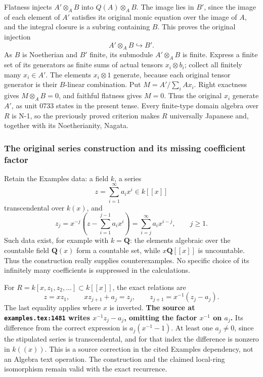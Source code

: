 Flatness injects \(A'\otimes_AB\) into \(Q(A)\otimes_AB\). The image lies in \(B'\), since the image of each element of \(A'\) satisfies its original monic equation over the image of \(A\), and the integral closure is a subring containing \(B\). This proves the original injection \[
 A'\otimes_AB\hookrightarrow B'.
\] As \(B\) is Noetherian and \(B'\) finite, its submodule \(A'\otimes_AB\) is finite. Express a finite set of its generators as finite sums of actual tensors \(x_i\otimes b_i\); collect all finitely many \(x_i\in A'\). The elements \(x_i\otimes1\) generate, because each original tensor generator is their \(B\)-linear combination. Put \(M=A'/\sum_iAx_i\). Right exactness gives \(M\otimes_AB=0\), and faithful flatness gives \(M=0\). Thus the original \(x_i\) generate \(A'\), as unit 0733 states in the present tense. Every finite-type domain algebra over \(R\) is N-1, so the previously proved criterion makes \(R\) universally Japanese and, together with its Noetherianity, Nagata.

\subsubsection{The original series construction and its missing coefficient factor}\label{the-original-series-construction-and-its-missing-coefficient-factor}

Retain the Examples data: a field \(k\), a series \[
 z=\sum_{i=1}^{\infty}a_ix^i\in k[[x]]
\] transcendental over \(k(x)\), and \[
 z_j=x^{-j}\left(z-\sum_{i=1}^{j-1}a_ix^i\right)
     =\sum_{i=j}^{\infty}a_ix^{i-j},\qquad j\ge1.
\] Such data exist, for example with \(k=\mathbf Q\): the elements algebraic over the countable field \(\mathbf Q(x)\) form a countable set, while \(x\mathbf Q[[x]]\) is uncountable. Thus the construction really supplies counterexamples. No specific choice of its infinitely many coefficients is suppressed in the calculations.

For \(R=k[x,z_1,z_2,\ldots]\subset k[[x]]\), the exact relations are \[
 z=xz_1,\qquad xz_{j+1}+a_j=z_j,
 \qquad z_{j+1}=x^{-1}(z_j-a_j).
\] The last equality applies where \(x\) is inverted. \textbf{The source at \texttt{examples.tex:1481} writes \(x^{-1}z_j-a_j\), omitting the factor \(x^{-1}\) on \(a_j\).} Its difference from the correct expression is \(a_j(x^{-1}-1)\). At least one \(a_j\ne0\), since the stipulated series is transcendental, and for that index the difference is nonzero in \(k((x))\). This is a source correction in the cited Examples dependency, not an Algebra text operation. The construction and the claimed local-ring isomorphism remain valid with the exact recurrence.

